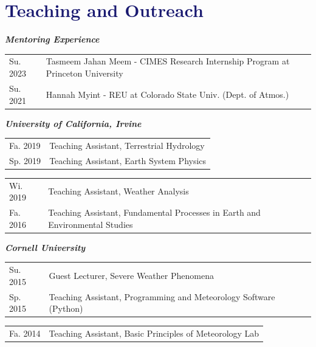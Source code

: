 \documentclass[margin,line,palatino,courier,10pt]{res}
\begin{document}
\begin{resume}

\vspace{-0.1in}
\noindent\textcolor{MidnightBlue}{\makebox[\linewidth][r]{\rule{\textwidth}{5pt}}}
\vspace{-0.3in}

\section{\sc \textcolor{MidnightBlue}{\large{\textbf{Teaching and Outreach}}}}

\textit{\textbf{Mentoring Experience}}
\vspace*{0.05in}\\
\begin{tabular}{@{}p{0.9in}p{4in}}
Su. 2023 & Tasmeem Jahan Meem - CIMES Research Internship Program at Princeton University\\
Su. 2021 & Hannah Myint - REU at Colorado State Univ. (Dept. of Atmos.)
\end{tabular}

\textit{\textbf{University of California, Irvine}}
\vspace*{0.05in}\\
\begin{tabular}{@{}p{0.9in}p{4in}}
Fa. 2019 & Teaching Assistant, Terrestrial Hydrology\\
Sp. 2019 & Teaching Assistant, Earth System Physics\\
\end{tabular}
\begin{tabular}{@{}p{0.9in}p{4in}}
Wi. 2019 & Teaching Assistant, Weather Analysis\\
Fa. 2016 & Teaching Assistant, Fundamental Processes in Earth and Environmental Studies\\
\end{tabular}

\newpage
\textit{\textbf{Cornell University}}
\vspace*{0.05in}\\
\begin{tabular}{@{}p{0.9in}p{4in}}
Su. 2015 & Guest Lecturer, Severe Weather Phenomena\\
Sp. 2015 & Teaching Assistant, Programming and Meteorology Software (Python)\\
\end{tabular}
\begin{tabular}{@{}p{0.9in}p{4in}}
Fa. 2014 & Teaching Assistant, Basic Principles of Meteorology Lab\\
\end{tabular}


\end{resume}
\end{document}
